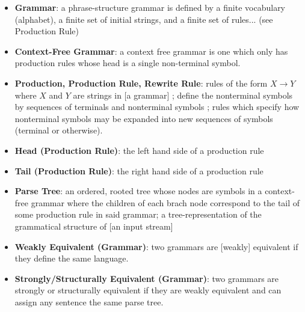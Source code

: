 \documentclass[11pt]{article}
\begin{document}
\begin{itemize}
\item \textbf{Grammar}: a phrase-structure grammar is defined by a finite vocabulary (alphabet), a finite set of
initial strings, and a finite set of rules... \cite{chomsky} (see Production Rule)
\item \textbf{Context-Free Grammar}: a context free grammar is one which only has production rules whose head is a single non-terminal symbol.
\cite{compiler, anatomy, formal_langs}
\item \textbf{Production, Production Rule, Rewrite Rule}: rules of the form $X \rightarrow Y$ where
$X$ and $Y$ are strings in [a grammar]  \cite{chomsky};
define the nonterminal symbols by sequences of terminals and nonterminal symbols \cite{compiler};
rules which specify how nonterminal symbols may be expanded into new sequences of symbols (terminal or otherwise).
\item \textbf{Head (Production Rule)}: the left hand side of a production rule
\item \textbf{Tail (Production Rule)}: the right hand side of a production rule
\item \textbf{Parse Tree}: an ordered, rooted tree whose nodes are symbols in a context-free grammar where the 
children of each brach node correspond to the tail of some production rule in said grammar;
a tree-representation of the grammatical structure of [an input stream] \cite{anatomy}
\item \textbf{Weakly Equivalent (Grammar)}: two grammars are [weakly] equivalent if they define the same language.\cite{reghizzi}
\item \textbf{Strongly/Structurally Equivalent (Grammar)}: two grammars are strongly or structurally equivalent
if they are weakly equivalent and can assign any sentence the same parse tree. \cite{reghizzi}
\end{itemize}

{}

\end{document}
